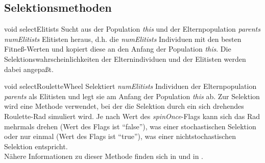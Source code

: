 \documentclass{report}
\begin{document}
\subsection{Selektionsmethoden}

\setNormalInstance
\setCorrectWidthThree{8pt}
\printMethodWithParamsSaved
{void}
{}
{selectElitists}
{Sucht aus der Population {\em this} und der Elternpopulation {\em parents} 
    {\em numElitists} Elitisten heraus, d.h. die {\em numElitists} 
    Individuen mit
    den besten Fitne{\ss}-Werten und kopiert diese an den Anfang der 
    Population {\em this}. Die Selektionswahrscheinlichkeiten der 
    Elternindividuen und der Elitisten werden dabei angepa{\ss}t.}
{}
\setCorrectWidthThree{4pt}

\vspace{4ex}

\setNormalInstance
\setCorrectWidthThree{8pt}
\printMethodWithParamsSaved
{void}
{}
{selectRouletteWheel}
{Selektiert {\em numElitists} Individuen der Elternpopulation {\em parents} 
 als Elitisten und legt sie am Anfang der Population {\em this} ab. Zur 
 Selektion wird eine Methode 
 verwendet, bei der die Selektion durch ein sich drehendes Roulette-Rad 
 simuliert wird. Je nach Wert des {\em spinOnce}-Flags kann 
 sich das Rad mehrmals drehen (Wert des Flags ist ``false''), was einer 
 stochastischen Selektion oder nur einmal (Wert des Flags ist ``true''), 
 was einer nichtstochastischen Selektion entspricht.\\
 N\"ahere Informationen zu dieser Methode finden sich in \cite{Search}
 und in \cite{Jong}.}
{}
\setCorrectWidthThree{4pt}
\end{document}
